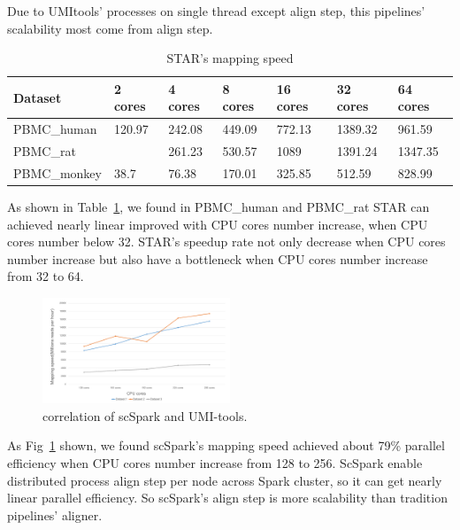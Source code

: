 \documentclass[conference]{IEEEtran}
\begin{document}
Due to UMI\-tools' processes on single thread except align step, this pipelines' scalability most come from align step.
\begin{table}
	\centering
	\caption{STAR's mapping speed}\label{tab3}
	\resizebox{0.45\textwidth}{!} {
	\begin{tabular}{l | l | l | l | l | l | l}
		\hline
		Dataset & 2 cores & 4 cores & 8 cores & 16 cores & 32 cores & 64 cores \\
		\hline
		PBMC\_human & 120.97 & 242.08 & 449.09 & 772.13 & 1389.32 & 961.59 \\
		PBMC\_rat &  & 261.23 & 530.57 & 1089 & 1391.24 & 1347.35 \\
		PBMC\_monkey  & 38.7 & 76.38 & 170.01 & 325.85 & 512.59 & 828.99 \\
		\hline
	\end{tabular} }
\end{table}
As shown in Table~\ref{tab3}, we found in PBMC\_human and PBMC\_rat STAR can achieved nearly linear improved with CPU cores number increase, when CPU cores number below 32.
STAR's speedup rate not only decrease when CPU cores number increase but also have a bottleneck when CPU cores number increase from 32 to 64.
\begin{figure}
	\includegraphics[width=0.5\textwidth]{Fig6.pdf}
	\caption{correlation of scSpark and UMI-tools.} \label{fig6}
  \end{figure}
As Fig~\ref{fig6} shown, we found scSpark's mapping speed achieved about 79\% parallel efficiency when CPU cores number increase from 128 to 256.
ScSpark enable distributed process align step per node across Spark cluster, so it can get nearly linear parallel efficiency.
So scSpark's align step is more scalability than tradition pipelines' aligner. 
\end{document}
